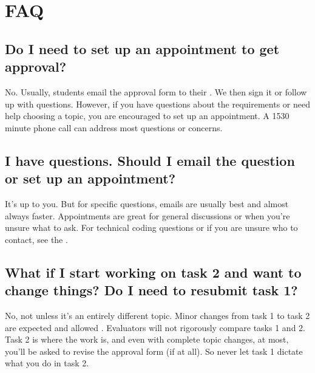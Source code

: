 \documentclass[letterpaper,10pt,english]{jupyterBook}
\begin{document}
\section{FAQ}
\label{\detokenize{task1:faq}}\label{\detokenize{task1:task1-faq}}

\subsection{Do I need to set up an appointment to get approval?}
\label{\detokenize{task1:do-i-need-to-set-up-an-appointment-to-get-approval}}
\sphinxAtStartPar
No. Usually, students email the approval form to their {\hyperref[\detokenize{ci_c964:ci-c964}]{}}. We then sign it or follow up with questions. However, if you have questions about the requirements or need help choosing a topic, you are encouraged to set up an appointment. A 15\sphinxhyphen{}30 minute phone call can address most questions or concerns.


\subsection{I have questions. Should I email the question or set up an appointment?}
\label{\detokenize{task1:i-have-questions-should-i-email-the-question-or-set-up-an-appointment}}
\sphinxAtStartPar
It’s up to you. But for specific questions, emails are usually best and almost always faster. Appointments are great for general discussions or when you’re unsure what to ask. For technical coding questions or if you are unsure who to contact, see the {\hyperref[\detokenize{ci_page:cipage}]{}}.


\subsection{What if I start working on task 2 and want to change things? Do I need to resubmit task 1?}
\label{\detokenize{task1:what-if-i-start-working-on-task-2-and-want-to-change-things-do-i-need-to-resubmit-task-1}}\label{\detokenize{task1:task1-faq-change-task1}}
\sphinxAtStartPar
No, not unless it’s an entirely different topic. Minor changes from task 1 to task 2 are expected and allowed . Evaluators will not rigorously compare tasks 1 and 2. Task 2 is where the work is, and even with complete topic changes, at most, you’ll be asked to revise the approval form (if at all). So never let task 1 dictate what you do in task 2.
\end{document}
